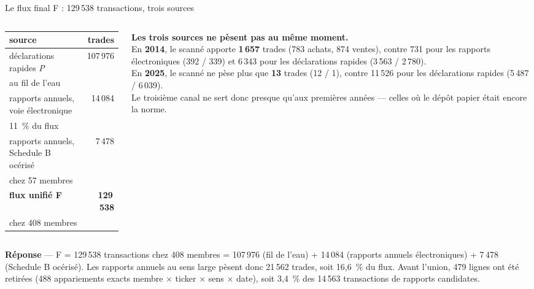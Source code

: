 \documentclass[11pt,aspectratio=169]{beamer}
\newcommand{\defl}[1]{{\scriptsize\color{black!55}#1}}
\newcommand{\repband}[1]{%
  \colorbox{okgreen!12}{\parbox{\dimexpr\textwidth-10pt}{\scriptsize
    \textbf{\textcolor{okgreen}{Réponse}}\; --- #1}}}
\begin{document}
\begin{frame}{Le flux final F : 129\,538 transactions, trois sources}
  \begin{columns}[T]
    \begin{column}{0.52\textwidth}
      \centering\scriptsize
      \begin{tabular}{l r}
        \toprule
        source & trades \\
        \midrule
        déclarations rapides \emph{P} & 107\,976 \\
        \defl{au fil de l'eau} & \\
        rapports annuels, voie électronique & 14\,084 \\
        \defl{11~\% du flux} & \\
        rapports annuels, Schedule B océrisé & 7\,478 \\
        \defl{chez 57 membres} & \\
        \midrule
        \textbf{flux unifié F} & \textbf{129\,538} \\
        \defl{chez 408 membres} & \\
        \bottomrule
      \end{tabular}
    \end{column}
    \begin{column}{0.46\textwidth}
      \footnotesize
      \textbf{Les trois sources ne pèsent pas au même moment.}\\[1.5mm]
      \scriptsize
      En \textbf{2014}, le scanné apporte \textbf{1\,657} trades (783 achats, 874 ventes),
      contre 731 pour les rapports électroniques (392 / 339) et 6\,343 pour les déclarations
      rapides (3\,563 / 2\,780).\\[1.5mm]
      En \textbf{2025}, le scanné ne pèse plus que \textbf{13} trades (12 / 1), contre 11\,526
      pour les déclarations rapides (5\,487 / 6\,039).\\[1.5mm]
      \defl{Le troisième canal ne sert donc presque qu'aux premières années --- celles où le
            dépôt papier était encore la norme.}
    \end{column}
  \end{columns}
  \vspace{2mm}

  \raggedright
  \repband{F = 129\,538 transactions chez 408 membres = 107\,976 (fil de l'eau) + 14\,084
    (rapports annuels électroniques) + 7\,478 (Schedule B océrisé). Les rapports annuels au sens
    large pèsent donc 21\,562 trades, soit 16,6~\% du flux. Avant l'union, 479 lignes ont été
    retirées (488 appariements exacts membre × ticker × sens × date), soit 3,4~\% des
    14\,563 transactions de rapports candidates.}
\end{frame}
\end{document}
